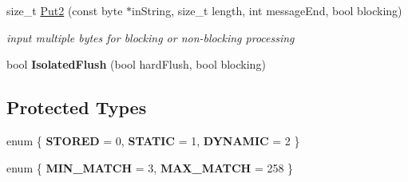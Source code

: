 \begin{DoxyCompactItemize}
\item 
size\_\-t \hyperlink{class_deflator_ab3ba26f52807a9b5d4af6948d56cd4a9}{Put2} (const byte $\ast$inString, size\_\-t length, int messageEnd, bool blocking)
\begin{DoxyCompactList}\small\item\em input multiple bytes for blocking or non-\/blocking processing \item\end{DoxyCompactList}\item 
\hypertarget{class_deflator_a4337716743ff155dc5321843eda29d00}{
bool {\bfseries IsolatedFlush} (bool hardFlush, bool blocking)}
\label{class_deflator_a4337716743ff155dc5321843eda29d00}

\end{DoxyCompactItemize}
\subsection*{Protected Types}
\begin{DoxyCompactItemize}
\item 
enum \{ {\bfseries STORED} =  0, 
{\bfseries STATIC} =  1, 
{\bfseries DYNAMIC} =  2
 \}
\item 
enum \{ {\bfseries MIN\_\-MATCH} =  3, 
{\bfseries MAX\_\-MATCH} =  258
 \}
\end{DoxyCompactItemize}
